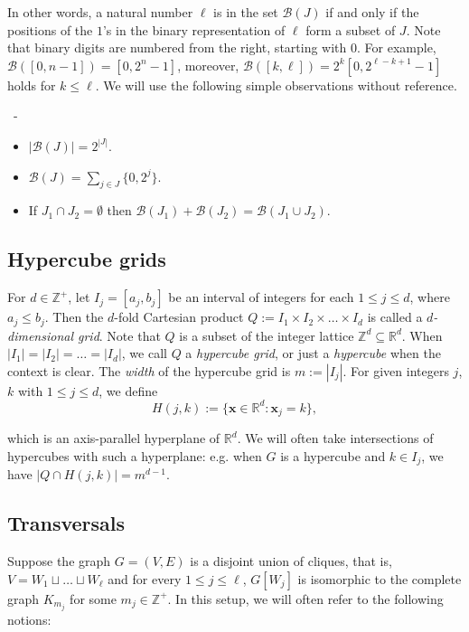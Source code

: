 \documentclass[10pt,a4paper]{article}
\numberwithin{equation}{section}
\newcommand{\zz}{\mathbb{Z}}
\newcommand{\rr}{\mathbb{R}}
\newcommand{\cB}{\mathcal{B}}
\begin{document}
In other words, a natural number $\ell$ is in the set $\cB(J)$  if and only if 
the positions of the $1$'s in the binary representation of $\ell$ form a subset of $J$.
Note that binary digits are numbered from the right, starting with $0$.
For example, $\cB([0,n-1])=[0,2^n-1]$,  moreover, $\cB([k,\ell])=2^k[0,2^{\ell-k+1}-1]$ holds for $k\le\ell$.
We will use the 
 following simple observations without reference.
 \begin{proposition} \ - 
 \begin{itemize}
\itemsep0em
\item $|\cB(J)|=2^{|J|}$.
\item $\cB(J)=\sum_{j\in J}\{0, 2^j\}$.
\item If $J_1\cap J_2=\emptyset$ then $\cB(J_1)+\cB(J_2)=\cB(J_1\cup J_2)$.
\end{itemize}
 \end{proposition}


\subsection{Hypercube grids}\label{subsec:intro_hypercube}

For $d\in \zz^{+}$, let $I_j=[a_j,b_j]$ be an interval of integers for each $1\le j\le d$, where $a_j\le b_j$. Then the $d$-fold Cartesian product $Q:=I_1\times I_2\times \ldots\times I_d$ is called a \textit{$d$-dimensional grid}. Note that $Q$ is a subset of the integer lattice $\zz^d\subseteq \rr^d$. When $|I_1|=|I_2|=\ldots=|I_d|$, we call $Q$ a \textit{hypercube grid}, or just a \textit{hypercube} when the context is clear. The \textit{width} of the hypercube grid is $m:=|I_j|$. For given integers $j$, $k$ with $1\le j\le d$, we define $$H(j,k):=\{\mathbf{x}\in \rr^d: \mathbf{x}_j=k\},$$

\noindent which is an axis-parallel hyperplane of $\rr^d$. We will often take intersections of hypercubes with such a hyperplane: e.g. when $G$ is a hypercube and $k\in I_j$, we have $|Q\cap H(j,k)|=m^{d-1}$.

\subsection{Transversals}\label{subsec:intro_transversals}

Suppose the graph $G=(V,E)$ is a disjoint union of cliques, that is, $V=W_1\sqcup \ldots\sqcup W_{\ell}$ and for every $1\le j\le \ell$, $G[W_j]$ is isomorphic to the complete graph $K_{m_j}$ for some $m_j\in \zz^{+}$. In this setup, we will often refer to the following notions:
\end{document}
